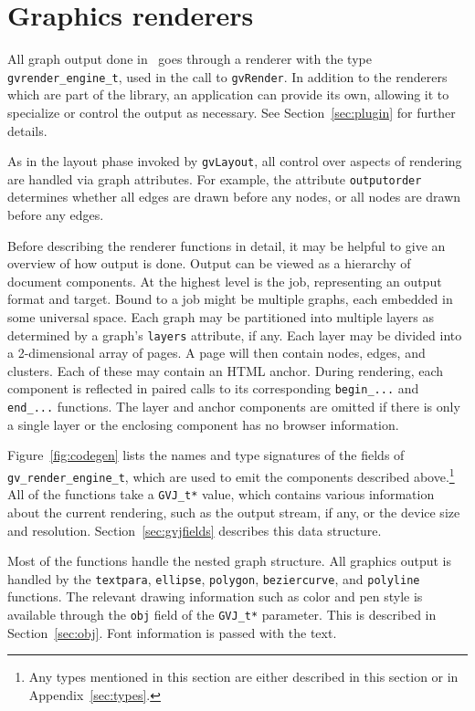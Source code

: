 \section{Graphics renderers}
\label{sec:renderers}

All graph output done in \gviz\ goes through a renderer
with the type {\tt gvrender\_engine\_t}, used in the call
to {\tt gvRender}.
In addition to the renderers which are part of the library, an application
can provide its own, allowing it to specialize or control the output
as necessary. See Section~\ref{sec:plugin} for further details.

As in the layout phase invoked by {\tt gvLayout}, all control over
aspects of rendering are handled via graph attributes. For example,
the attribute {\tt outputorder} determines whether all edges are drawn
before any nodes, or all nodes are drawn before any edges.

Before describing the renderer functions in detail, it may be helpful
to give an overview of how output is done. Output can be viewed as a hierarchy
of document components. At the highest level is the job, representing 
an output format and target. Bound to a job might be multiple graphs,
each embedded in some universal space. Each graph may be partitioned
into multiple layers as determined by a graph's {\tt layers} attribute,
if any. Each layer may be divided into a 2-dimensional array
of pages. A page will then contain nodes, edges, and clusters. Each of
these may contain an HTML anchor.
During rendering, each component
is reflected in paired calls to its corresponding {\tt begin\_...} and
{\tt end\_...} functions. The layer and anchor components are omitted if
there is only a single layer or the enclosing component has no browser
information. 

Figure~\ref{fig:codegen} lists the names and type signatures of
the fields of {\tt gv\_render\_engine\_t}, which are used to emit the components
described above.\footnote{Any types mentioned in this section are
either described in this section or in Appendix~\ref{sec:types}.}
All of the functions take a {\tt GVJ\_t*} value, which
contains various information about the current rendering, such as the
output stream, if any, or the device size and resolution.
Section~\ref{sec:gvjfields} describes this data structure.

Most of the functions handle the nested graph structure.
All graphics output is handled by the {\tt textpara}, {\tt ellipse},
{\tt polygon}, {\tt beziercurve}, and {\tt polyline} functions.
The relevant drawing information such as color and pen style
is available through the {\tt obj} field of the
{\tt GVJ\_t*} parameter. 
This is described in Section~\ref{sec:obj}.
Font information is passed with the text.

